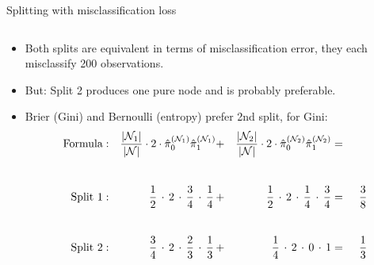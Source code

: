 \documentclass[11pt,compress,t,notes=noshow, xcolor=table]{beamer}
\begin{document}
\begin{vbframe}{Splitting with misclassification loss}
\begin{small}
\begin{columns}[T,onlytextwidth]
\begin{center}
\end{center}
\end{columns}
\end{small}

\lz

\begin{itemize}
\item Both splits are equivalent in terms of misclassification error, they each misclassify 200 observations. 
\item But: Split 2 produces one pure node and is probably preferable.

\framebreak


\item Brier (Gini) and Bernoulli (entropy) prefer 2nd split, for Gini:\\
\begin{alignat*}{6}
\text{Formula}&:& \frac{|\Nl|}{|\Np|}\cdot 2 \cdot\pikNlh[0]\pikNlh[1] &+& \frac{|\Nr|}{|\Np|}\cdot 2 \cdot \pikNrh[0]\pikNrh[1] &=& \\[5ex]
\text{Split 1}&:& \,\, \frac{1}{2} \,\cdot \, 2 \,\cdot\, \frac{3}{4} \,\cdot\, \frac{1}{4} \,&+&\,  \, \frac{1}{2} \,\cdot\, 2 \, \cdot\, \frac{1}{4} \,\cdot\, \frac{3}{4} &=&\;\, \frac{3}{8}\\[5ex]
\text{Split 2}&:& \frac{3}{4}\, \cdot\, 2 \,\cdot\,\frac{2}{3}\,\cdot\,\frac{1}{3}\, &+& \frac{1}{4} \,\cdot\, 2 \,\cdot\, 0 \,\cdot\, 1 &=&\; \,\frac{1}{3}
\end{alignat*}
\end{itemize}
\end{vbframe}
\end{document}
